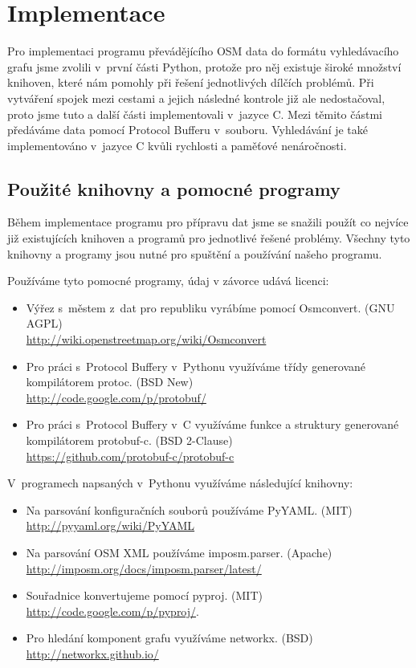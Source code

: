 \chapter{Implementace}
Pro implementaci programu převádějícího OSM data do formátu vyhledávacího grafu
jsme zvolili v~první části Python, protože pro něj existuje široké množství
knihoven, které nám pomohly při řešení jednotlivých dílčích problémů. Při
vytváření spojek mezi cestami a jejich následné kontrole již ale nedostačoval,
proto jsme tuto a další části implementovali v~jazyce C. Mezi těmito částmi
předáváme data pomocí Protocol Bufferu v~souboru. Vyhledávání je také
implementováno v~jazyce C kvůli rychlosti a paměťové nenáročnosti.

\section{Použité knihovny a pomocné programy}
Během implementace programu pro přípravu dat jsme se snažili použít co nejvíce
již existujících knihoven a programů pro jednotlivé řešené problémy. Všechny
tyto knihovny a programy jsou nutné pro spuštění a používání našeho programu. 

\medskip
\noindent Používáme tyto pomocné programy, údaj v závorce udává licenci:
\begin{itemize}
	\item Výřez s~městem z~dat pro republiku vyrábíme pomocí {\tuc
	Osmconvert}. (GNU AGPL)\\
	\url{http://wiki.openstreetmap.org/wiki/Osmconvert}
	\item Pro práci s~Protocol Buffery v~Pythonu využíváme třídy generované
	kompilátorem {\tuc protoc}. (BSD New)\\
	\url{http://code.google.com/p/protobuf/}
	\item Pro práci s~Protocol Buffery v~C využíváme funkce a struktury
	generované kompilátorem {\tuc protobuf-c}. (BSD 2-Clause)\\
	\url{https://github.com/protobuf-c/protobuf-c}
\end{itemize}

\noindent V~programech napsaných v~Pythonu využíváme následující knihovny:
\begin{itemize}
	\item Na parsování konfiguračních souborů používáme {\tuc PyYAML}.
	(MIT)\\
	\url{http://pyyaml.org/wiki/PyYAML}
	\item Na parsování OSM XML používáme {\tuc imposm.parser}. (Apache)\\
	\url{http://imposm.org/docs/imposm.parser/latest/}
	\item Souřadnice konvertujeme pomocí {\tuc pyproj}. (MIT)\\
	\url{http://code.google.com/p/pyproj/}.
	\item Pro hledání komponent grafu využíváme {\tuc networkx}. (BSD)\\
	\url{http://networkx.github.io/}
\end{itemize}

